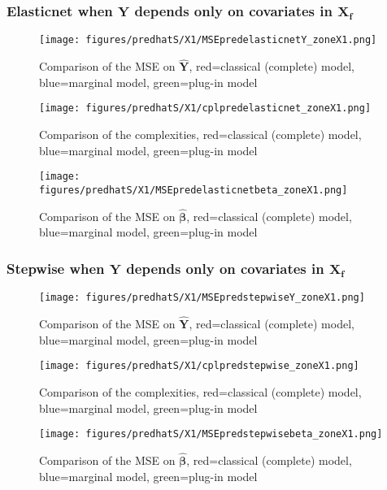\documentclass[12pt,a4paper]{report}
\begin{document}
\subsubsection{Elasticnet when $\boldsymbol{Y}$ depends only on covariates in $\boldsymbol{X_f}$}

	\begin{figure}[h!]
	\centering
		  \texttt{[image: figures/predhatS/X1/MSEpredelasticnetY\_zoneX1.png]}
		\caption{Comparison of the MSE on $\hat{\boldsymbol{Y}}$, red=classical (complete) model, blue=marginal model, green=plug-in model}\label{MSEpredelasticnetY_zoneX1}
	\end{figure}
	\begin{figure}[h!]
	\centering
		  \texttt{[image: figures/predhatS/X1/cplpredelasticnet\_zoneX1.png]}
		\caption{Comparison of the complexities, red=classical (complete) model, blue=marginal model, green=plug-in model}\label{cplpredelasticnet_zoneX1}
	\end{figure}
	\begin{figure}[h!]
	\centering
		  \texttt{[image: figures/predhatS/X1/MSEpredelasticnetbeta\_zoneX1.png]}
		\caption{Comparison of the MSE on $\hat{\boldsymbol{\beta}}$, red=classical (complete) model, blue=marginal model, green=plug-in model}\label{MSEpredelasticnetbeta_zoneX1}
	\end{figure}
	\FloatBarrier
\newpage
\subsubsection{Stepwise when $\boldsymbol{Y}$ depends only on covariates in $\boldsymbol{X_f}$}

	\begin{figure}[h!]
	\centering
		  \texttt{[image: figures/predhatS/X1/MSEpredstepwiseY\_zoneX1.png]}
		\caption{Comparison of the MSE on $\hat{\boldsymbol{Y}}$, red=classical (complete) model, blue=marginal model, green=plug-in model}\label{MSEpredstepwiseY_zoneX1}
	\end{figure}
	\begin{figure}[h!]
	\centering
		  \texttt{[image: figures/predhatS/X1/cplpredstepwise\_zoneX1.png]}
		\caption{Comparison of the complexities, red=classical (complete) model, blue=marginal model, green=plug-in model}\label{cplpredstepwise_zoneX1}
	\end{figure}
	\begin{figure}[h!]
	\centering
		  \texttt{[image: figures/predhatS/X1/MSEpredstepwisebeta\_zoneX1.png]}
		\caption{Comparison of the MSE on $\hat{\boldsymbol{\beta}}$, red=classical (complete) model, blue=marginal model, green=plug-in model}\label{MSEpredstepwisebeta_zoneX1}
	\end{figure}
	\FloatBarrier
\newpage
\end{document}
